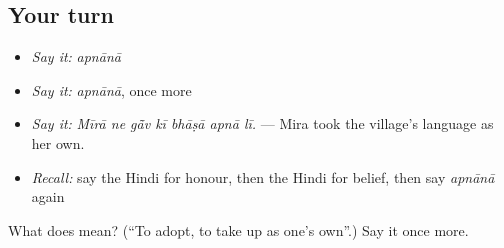 \subsection*{Your turn}
\begin{itemize}
\raggedright
  \item \emph{Say it:} \emph{apnānā}
  \item \emph{Say it:} \emph{apnānā}, once more
  \item \emph{Say it:} \emph{Mīrā ne gā̃v kī bhāṣā apnā lī.} — Mira took the village's language as her own.
  \item \emph{Recall:} say the Hindi for honour, then the Hindi for belief, then say \emph{apnānā} again
\end{itemize}

\begin{tcolorbox}[breakable,colback=teal!4,colframe=teal!35!black,title={Before you move on}]
What does  mean? (\textquotedblleft{}To adopt, to take up as one's own\textquotedblright{}.) Say it once more.
\end{tcolorbox}
